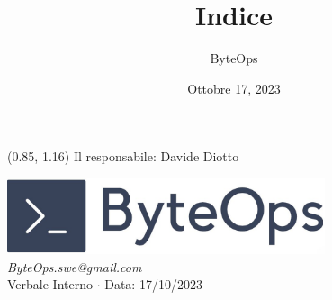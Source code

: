\documentclass{article}
\title{\textbf{\fontsize{28}{6}\selectfont Indice}}
\author{\fontsize{14}{6}\selectfont ByteOps}
\date{Ottobre 17, 2023}
\begin{document}
\begin{textblock*}{\textwidth}(0.85\textwidth, 1.16\textheight)
    Il responsabile: Davide Diotto
\end{textblock*}

\pagestyle{fancy}
\begin{center}
\includegraphics[width = 0.7\textwidth]{../../../Images/logo.png} \\
\vspace{0.2cm}
\textcolor[RGB]{60, 60, 60}{\textit{ByteOps.swe@gmail.com}} \\
\vspace{1cm}
\fontsize{16}{6}\selectfont Verbale Interno $\cdot$ Data: 17/10/2023 \\
\vspace{0.5cm}
\end{center}
\end{document}
